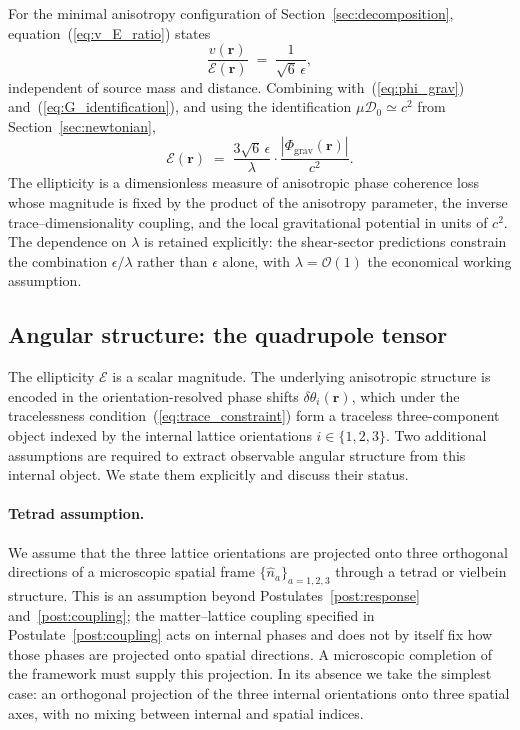 \documentclass[pdflatex,sn-mathphys-num]{sn-jnl}%
\theoremstyle{thmstyleone}%
\theoremstyle{thmstyletwo}%
\theoremstyle{thmstylethree}%
\begin{document}
For the minimal anisotropy configuration of
Section~\ref{sec:decomposition},
equation~(\ref{eq:v_E_ratio}) states
\begin{equation}
    \frac{v(\mathbf{r})}{\mathcal{E}(\mathbf{r})}
    \;=\;
    \frac{1}{\sqrt{6}\,\epsilon},
    \label{eq:ratio_restate}
\end{equation}
independent of source mass and distance. Combining
with~(\ref{eq:phi_grav}) and~(\ref{eq:G_identification}), and
using the identification $\mu\mathcal{D}_0\simeq c^2$ from
Section~\ref{sec:newtonian},
\begin{equation}
    \mathcal{E}(\mathbf{r})
    \;=\;
    \frac{3\sqrt{6}\,\epsilon}{\lambda}\cdot
    \frac{|\Phi_{\mathrm{grav}}(\mathbf{r})|}{c^2}.
    \label{eq:E_from_Phi}
\end{equation}
The ellipticity is a dimensionless measure of anisotropic
phase coherence loss whose magnitude is fixed by the product
of the anisotropy parameter, the inverse trace--dimensionality
coupling, and the local gravitational potential in units of
$c^2$. The dependence on $\lambda$ is retained explicitly: the
shear-sector predictions constrain the combination
$\epsilon/\lambda$ rather than $\epsilon$ alone, with
$\lambda=\mathcal{O}(1)$ the economical working assumption.

\subsection{Angular structure: the quadrupole tensor}
\label{sec:quadrupole}

The ellipticity $\mathcal{E}$ is a scalar magnitude. The
underlying anisotropic structure is encoded in the
orientation-resolved phase shifts
$\delta\theta_i(\mathbf{r})$, which under the tracelessness
condition~(\ref{eq:trace_constraint}) form a traceless
three-component object indexed by the internal lattice
orientations $i\in\{1,2,3\}$. Two additional assumptions are
required to extract observable angular structure from this
internal object. We state them explicitly and discuss their
status.

\paragraph{Tetrad assumption.}
We assume that the three lattice orientations are projected
onto three orthogonal directions of a microscopic spatial
frame $\{\hat{n}_a\}_{a=1,2,3}$ through a tetrad or vielbein
structure. This is an assumption beyond
Postulates~\ref{post:response} and~\ref{post:coupling}; the
matter--lattice coupling specified in
Postulate~\ref{post:coupling} acts on internal phases and does
not by itself fix how those phases are projected onto
spatial directions. A microscopic completion of the framework
must supply this projection. In its absence we take the
simplest case: an orthogonal projection of the three internal
orientations onto three spatial axes, with no mixing between
internal and spatial indices.
\end{document}
